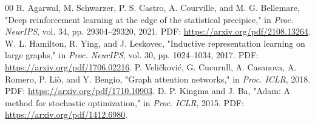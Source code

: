 \documentclass[conference]{IEEEtran}
\begin{document}
\begin{thebibliography}{00}
 R. Agarwal, M. Schwarzer, P. S. Castro, A. Courville, and M. G. Bellemare, "Deep reinforcement learning at the edge of the statistical precipice," in \emph{Proc. NeurIPS}, vol. 34, pp. 29304--29320, 2021. PDF: \url{https://arxiv.org/pdf/2108.13264}.
 W. L. Hamilton, R. Ying, and J. Leskovec, "Inductive representation learning on large graphs," in \emph{Proc. NeurIPS}, vol. 30, pp. 1024--1034, 2017. PDF: \url{https://arxiv.org/pdf/1706.02216}.
 P. Veli\v{c}kovi\'c, G. Cucurull, A. Casanova, A. Romero, P. Li\`o, and Y. Bengio, "Graph attention networks," in \emph{Proc. ICLR}, 2018. PDF: \url{https://arxiv.org/pdf/1710.10903}.
 D. P. Kingma and J. Ba, "Adam: A method for stochastic optimization," in \emph{Proc. ICLR}, 2015. PDF: \url{https://arxiv.org/pdf/1412.6980}.
\end{thebibliography}
\end{document}
